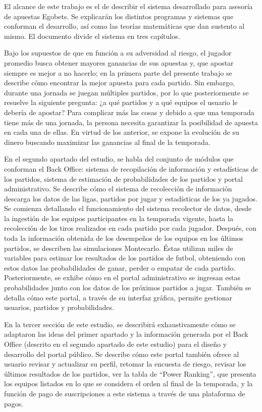 El alcance de este trabajo es el de describir el sistema desarrollado para asesoría de apuestas Egobets. Se explicarán los distintos programas y sistemas que conforman el desarrollo, así como las teorías matemáticas que dan sustento al mismo. El documento divide el sistema en tres capítulos.

Bajo los supuestos de que en función a su adversidad al riesgo, el jugador promedio busca obtener mayores ganancias de sus apuestas  y, que apostar siempre es mejor a no hacerlo; en la primera parte del presente trabajo se describe cómo encontrar la mejor apuesta para cada partido. Sin embargo, durante una jornada se juegan múltiples partidos, por lo que posteriormente se resuelve la siguiente pregunta: ¿a qué partidos y a qué equipos el usuario le debería de apostar? Para complicar más las cosas y debido a que una temporada tiene más de una jornada, la persona necesita garantizar la posibilidad de apuesta en cada una de ellas. En virtud de los anterior, se expone la evolución de su dinero buscando maximizar las ganancias al final de la temporada. 


En el segundo apartado del estudio, se habla del conjunto de módulos que conforman el Back Office: sistema de recopilación de información y estadísticas de los partidos, sistema de estimación de probabilidades de los partidos y portal administrativo. Se describe cómo el sistema de recolección de información descarga los datos de las ligas, partidos por jugar y estadísticas de los ya jugados. Se comienza detallando el funcionamiento del sistema recolector de datos, desde la ingestión de los equipos participantes en la temporada vigente, hasta la recolección de los tiros realizados en cada partido por cada jugador. Después, con toda la información obtenida de los desempeños de los equipos en los últimos partidos, se describen las simulaciones Montecarlo. Éstas utilizan miles de variables para estimar los resultados de los partidos de futbol, obteniendo con estos datos las probabilidades de ganar, perder o empatar de cada partido. Posteriormente, se exhibe cómo en el portal administrativo se ingresan estas probabilidades junto con los datos de los próximos partidos a jugar. También se detalla cómo este portal, a través de su interfaz gráfica, permite gestionar usuarios, partidos y probabilidades.


En la tercer sección de este estudio, se describirá exhaustivamente cómo se adaptaron las ideas del primer apartado y la información generada por el Back Office (descrito en el segundo apartado de este estudio) para el diseño y desarrollo del portal público. Se describe cómo este portal también ofrece al usuario revisar y actualizar su perfil, retomar la encuesta de riesgo, revisar los últimos resultados de los partidos, ver la tabla de ``Power Ranking'', que presenta los equipos listados en lo que se considera el orden al final de la temporada, y la función de pago de suscripciones a este sistema a través de una plataforma de pagos.


